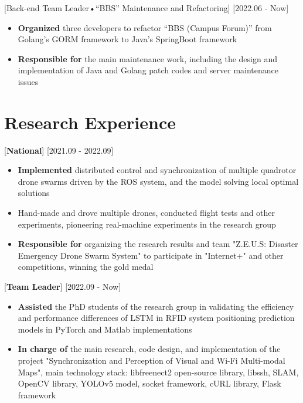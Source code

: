 \documentclass{resume}
\begin{document}
    [Back-end Team Leader•“BBS” Maintenance and Refactoring]
    [2022.06 - Now] 

    \begin{itemize}
        \item \textbf{Organized} three developers to refactor “BBS (Campus Forum)” from Golang's GORM framework to Java's SpringBoot framework
        \item \textbf{Responsible for} the main maintenance work, including the design and implementation of Java and Golang patch codes and server maintenance issues
    \end{itemize}


    \section{Research Experience}

    [\textbf{National}]
    [2021.09 - 2022.09]
    \begin{itemize}
        \item \textbf{Implemented} distributed control and synchronization of multiple quadrotor drone swarms driven by the ROS system, and the model solving local optimal solutions
        \item Hand-made and drove multiple drones, conducted flight tests and other experiments, pioneering real-machine experiments in the research group
        \item \textbf{Responsible for} organizing the research results and team "Z.E.U.S: Disaster Emergency Drone Swarm System" to participate in "Internet+" and other competitions, winning the gold medal
    \end{itemize}

    [\textbf{Team Leader}]
    [2022.09 - Now]
    \begin{itemize}
        \item \textbf{Assisted} the PhD students of the research group in validating the efficiency and performance differences of LSTM in RFID system positioning prediction models in PyTorch and Matlab implementations  
        \item \textbf{In charge of} the main research, code design, and implementation of the project "Synchronization and Perception of Visual and Wi-Fi Multi-modal Maps", main technology stack: libfreenect2 open-source library, libssh, SLAM, OpenCV library, YOLOv5 model, socket framework, cURL library, Flask framework
    \end{itemize}
\end{document}
